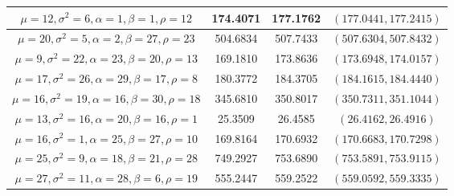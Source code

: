 \documentclass[12pt,travaildirige,nobabel, twoside]{dms}
\numberwithin{equation}{section}
\numberwithin{table}{chapter}
\numberwithin{figure}{chapter}
\begin{document}
\begin {table}[h]
\begin{adjustbox}{width=1.1\textwidth}
\begin{tabular}{|c|c|c|c|}
   	\hline
$\mu=12,\sigma^2= 6,\alpha= 1,\beta= 1,\rho=12$   & 174.4071  & 177.1762  &   $(177.0441,177.2415) $  \\   
   	\hline
$\mu=20,\sigma^2= 5,\alpha= 2,\beta=27,\rho=23$   & 504.6834  & 507.7433  &   $(507.6304,507.8432) $  \\   
   	\hline
$\mu= 9,\sigma^2=22,\alpha=23,\beta=20,\rho=13$   & 169.1810  & 173.8636  &   $(173.6948,174.0157) $  \\   
   	\hline
$\mu=17,\sigma^2=26,\alpha=29,\beta=17,\rho= 8$   & 180.3772  & 184.3705  &   $(184.1615,184.4440) $  \\   
   	\hline
$\mu=16,\sigma^2=19,\alpha=16,\beta=30,\rho=18$   & 345.6810  & 350.8017  &   $(350.7311,351.1044) $  \\   
   	\hline
$\mu=13,\sigma^2=16,\alpha=20,\beta=16,\rho= 1$   & 25.3509  & 26.4585  &   $(26.4162,26.4916) $  \\   
   	\hline
$\mu=16,\sigma^2= 1,\alpha=25,\beta=27,\rho=10$   & 169.8164  & 170.6932  &   $(170.6683,170.7298) $  \\   
   	\hline
$\mu=25,\sigma^2= 9,\alpha=18,\beta=21,\rho=28$   & 749.2927  & 753.6890  &   $(753.5891,753.9115) $  \\   
   	\hline
$\mu=27,\sigma^2=11,\alpha=28,\beta= 6,\rho=19$   & 555.2447  & 559.2522  &   $(559.0592,559.3335) $  \\   
   	\hline

\end{tabular}
\end{adjustbox}


\end {table}
\end{document}
